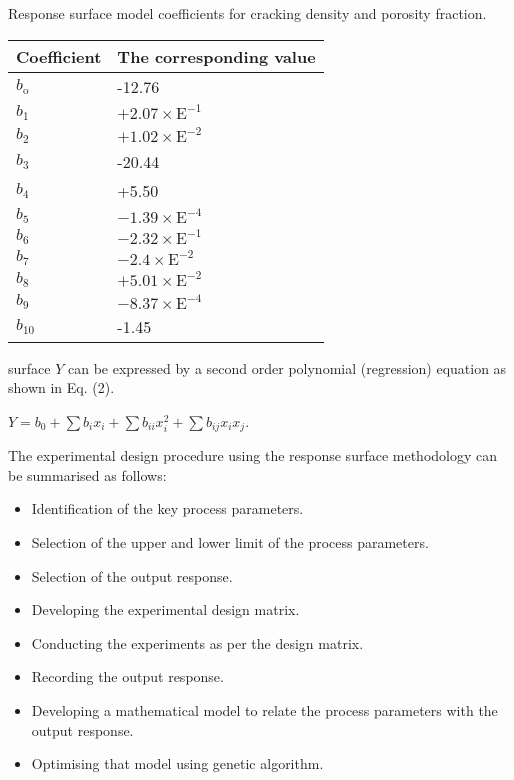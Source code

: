 \documentclass[10pt]{article}
\begin{document}
Response surface model coefficients for cracking density and porosity fraction.

\begin{center}
\begin{tabular}{ll}
\hline
Coefficient & The corresponding value \\
\hline
$b_{\mathrm{o}}$ & -12.76 \\
$b_{1}$ & $+2.07 \times \mathrm{E}^{-1}$ \\
$b_{2}$ & $+1.02 \times \mathrm{E}^{-2}$ \\
$b_{3}$ & -20.44 \\
$b_{4}$ & +5.50 \\
$b_{5}$ & $-1.39 \times \mathrm{E}^{-4}$ \\
$b_{6}$ & $-2.32 \times \mathrm{E}^{-1}$ \\
$b_{7}$ & $-2.4 \times \mathrm{E}^{-2}$ \\
$b_{8}$ & $+5.01 \times \mathrm{E}^{-2}$ \\
$b_{9}$ & $-8.37 \times \mathrm{E}^{-4}$ \\
$b_{10}$ & -1.45 \\
\end{tabular}
\end{center}

surface $Y$ can be expressed by a second order polynomial (regression) equation as shown in Eq. (2).

$Y=b_{0}+\sum b_{i} x_{i}+\sum b_{i i} x_{i}^{2}+\sum b_{i j} x_{i} x_{j}$.

The experimental design procedure using the response surface methodology can be summarised as follows:

\begin{itemize}
  \item Identification of the key process parameters.
  \item Selection of the upper and lower limit of the process parameters.
  \item Selection of the output response.
  \item Developing the experimental design matrix.
  \item Conducting the experiments as per the design matrix.
  \item Recording the output response.
  \item Developing a mathematical model to relate the process parameters with the output response.
  \item Optimising that model using genetic algorithm.
\end{itemize}
\end{document}
